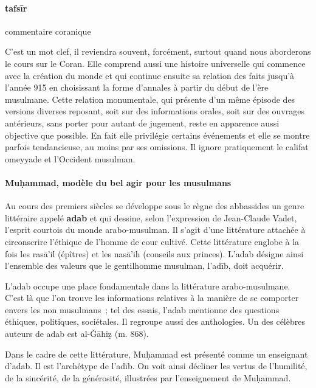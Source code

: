 \paragraph{{tafsīr}}
\begin{Def}[tafsīr]

commentaire
coranique

\end{Def}

C'est un mot clef, il reviendra souvent, forcément, surtout quand nous
aborderons le cours sur le Coran. Elle comprend aussi une histoire
universelle qui commence avec la création du monde et qui continue
ensuite sa relation des faits jusqu'à l'année 915 en choisissant la
forme d'annales à partir du début de l'ère musulmane. Cette relation
monumentale, qui présente d'un même épisode des versions diverses
reposant, soit sur des informations orales, soit sur des ouvrages
antérieurs, sans porter pour autant de jugement, reste en apparence
aussi objective que possible. En fait elle privilégie certains
événements et elle se montre parfois tendancieuse, au moins par ses
omissions. Il ignore pratiquement le califat omeyyade et l'Occident
musulman.

\paragraph{Muḥammad, modèle du bel agir pour les
musulmans}

Au cours des premiers siècles se développe sous le règne des abbassides
un genre littéraire appelé {\textbf{adab}} et qui dessine, selon
l'expression de Jean-Claude Vadet, l'esprit courtois du monde
arabo-musulman. Il s'agit d'une littérature attachée à circonscrire
l'éthique de l'homme de cour cultivé. Cette littérature englobe à la
fois les rasā'il (épîtres) et les nasā'ih (conseils aux princes).
{L'adab} désigne ainsi l'ensemble des valeurs que le gentilhomme
musulman, l'adīb, doit acquérir.

L'adab occupe une place fondamentale dans la littérature
arabo-musulmane. C'est là que l'on trouve les informations relatives à
la manière de se comporter envers les non musulmans~; tel des essais,
l'adab mentionne des questions éthiques, politiques, sociétales. Il
regroupe aussi des anthologies. Un des célèbres auteurs de adab est
al-Ǧāhiẓ (m. 868).

Dans le cadre de cette littérature, Muḥammad est présenté comme un
enseignant d'adab. Il est l'archétype de l'adīb. On voit ainsi décliner
les vertus de l'humilité, de la sincérité, de la générosité, illustrées
par l'enseignement de Muḥammad.


